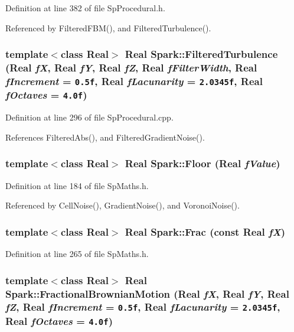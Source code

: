 Definition at line 382 of file Sp\-Procedural.h.

Referenced by Filtered\-FBM(), and Filtered\-Turbulence().
\subsubsection{\setlength{\rightskip}{0pt plus 5cm}template$<$class Real$>$ Real Spark::Filtered\-Turbulence (Real {\em f\-X}, Real {\em f\-Y}, Real {\em f\-Z}, Real {\em f\-Filter\-Width}, Real {\em f\-Increment} = {\tt 0.5f}, Real {\em f\-Lacunarity} = {\tt 2.0345f}, Real {\em f\-Octaves} = {\tt 4.0f})}\label{namespaceSpark_a82}


Definition at line 296 of file Sp\-Procedural.cpp.

References Filtered\-Abs(), and Filtered\-Gradient\-Noise().
\subsubsection{\setlength{\rightskip}{0pt plus 5cm}template$<$class Real$>$ Real Spark::Floor (Real {\em f\-Value})}\label{namespaceSpark_a44}


Definition at line 184 of file Sp\-Maths.h.

Referenced by Cell\-Noise(), Gradient\-Noise(), and Voronoi\-Noise().
\subsubsection{\setlength{\rightskip}{0pt plus 5cm}template$<$class Real$>$ Real Spark::Frac (const Real {\em f\-X})}\label{namespaceSpark_a58}


Definition at line 265 of file Sp\-Maths.h.
\subsubsection{\setlength{\rightskip}{0pt plus 5cm}template$<$class Real$>$ Real Spark::Fractional\-Brownian\-Motion (Real {\em f\-X}, Real {\em f\-Y}, Real {\em f\-Z}, Real {\em f\-Increment} = {\tt 0.5f}, Real {\em f\-Lacunarity} = {\tt 2.0345f}, Real {\em f\-Octaves} = {\tt 4.0f})}\label{namespaceSpark_a76}


